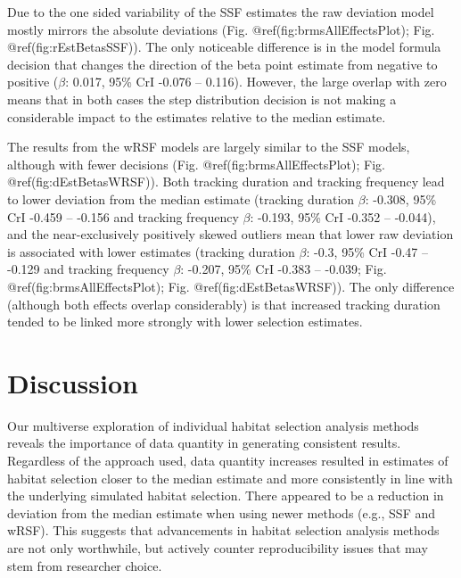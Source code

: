 \documentclass[10pt,a4paper]{article}
\begin{document}
Due to the one sided variability of the SSF estimates the raw deviation model mostly mirrors the absolute deviations (Fig. @ref(fig:brmsAllEffectsPlot); Fig. @ref(fig:rEstBetasSSF)).
The only noticeable difference is in the model formula decision that changes the direction of the beta point estimate from negative to positive (\(\beta\): 0.017, 95\% CrI -0.076 -- 0.116).
However, the large overlap with zero means that in both cases the step distribution decision is not making a considerable impact to the estimates relative to the median estimate.

The results from the wRSF models are largely similar to the SSF models, although with fewer decisions (Fig. @ref(fig:brmsAllEffectsPlot); Fig. @ref(fig:dEstBetasWRSF)).
Both tracking duration and tracking frequency lead to lower deviation from the median estimate (tracking duration \(\beta\): -0.308, 95\% CrI -0.459 -- -0.156 and tracking frequency \(\beta\): -0.193, 95\% CrI -0.352 -- -0.044), and the near-exclusively positively skewed outliers mean that lower raw deviation is associated with lower estimates (tracking duration \(\beta\): -0.3, 95\% CrI -0.47 -- -0.129 and tracking frequency \(\beta\): -0.207, 95\% CrI -0.383 -- -0.039; Fig. @ref(fig:brmsAllEffectsPlot); Fig. @ref(fig:dEstBetasWRSF)).
The only difference (although both effects overlap considerably) is that increased tracking duration tended to be linked more strongly with lower selection estimates.

\section{Discussion}\label{discussion}

Our multiverse exploration of individual habitat selection analysis methods reveals the importance of data quantity in generating consistent results.
Regardless of the approach used, data quantity increases resulted in estimates of habitat selection closer to the median estimate and more consistently in line with the underlying simulated habitat selection.
There appeared to be a reduction in deviation from the median estimate when using newer methods (e.g., SSF and wRSF).
This suggests that advancements in habitat selection analysis methods are not only worthwhile, but actively counter reproducibility issues that may stem from researcher choice.
\end{document}
